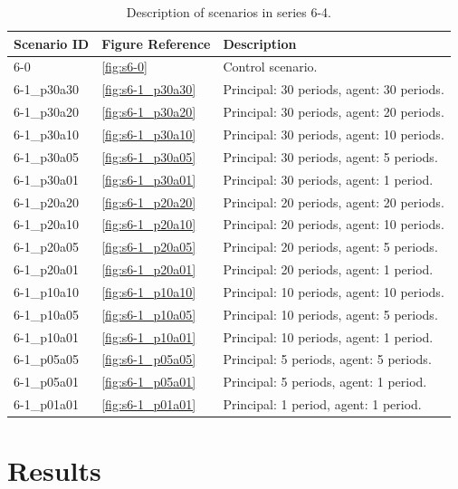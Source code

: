 \begin{table}
  \centering
  \begin{tabular}{lll}
    \hline
    Scenario ID & Figure Reference & Description \\
    \hline
    6-0 & \ref{fig:s6-0} & Control scenario. \\
    6-1\_p30a30 & \ref{fig:s6-1_p30a30} & Principal: 30 periods, agent: 30 periods. \\
    6-1\_p30a20 & \ref{fig:s6-1_p30a20} & Principal: 30 periods, agent: 20 periods. \\
    6-1\_p30a10 & \ref{fig:s6-1_p30a10} & Principal: 30 periods, agent: 10 periods. \\
    6-1\_p30a05 & \ref{fig:s6-1_p30a05} & Principal: 30 periods, agent: 5 periods.   \\
    6-1\_p30a01 & \ref{fig:s6-1_p30a01} & Principal: 30 periods, agent: 1 period.     \\
    6-1\_p20a20 & \ref{fig:s6-1_p20a20} & Principal: 20 periods, agent: 20 periods.\\
    6-1\_p20a10 & \ref{fig:s6-1_p20a10} & Principal: 20 periods, agent: 10 periods.\\
    6-1\_p20a05 & \ref{fig:s6-1_p20a05} & Principal: 20 periods, agent: 5 periods. \\
    6-1\_p20a01 & \ref{fig:s6-1_p20a01} & Principal: 20 periods, agent: 1 period.  \\
    6-1\_p10a10 & \ref{fig:s6-1_p10a10} & Principal: 10 periods, agent: 10 periods.\\
    6-1\_p10a05 & \ref{fig:s6-1_p10a05} & Principal: 10 periods, agent: 5 periods. \\
    6-1\_p10a01 & \ref{fig:s6-1_p10a01} & Principal: 10 periods, agent: 1 period.  \\
    6-1\_p05a05 & \ref{fig:s6-1_p05a05} & Principal: 5 periods, agent: 5 periods. \\
    6-1\_p05a01 & \ref{fig:s6-1_p05a01} & Principal: 5 periods, agent: 1 period.  \\
    6-1\_p01a01 & \ref{fig:s6-1_p01a01} & Principal: 1 period, agent: 1 period.  \\
    \hline
  \end{tabular}
  \caption{Description of scenarios in series 6-4.}
  \label{tab:scenario_list}
\end{table}

\section{Results}

